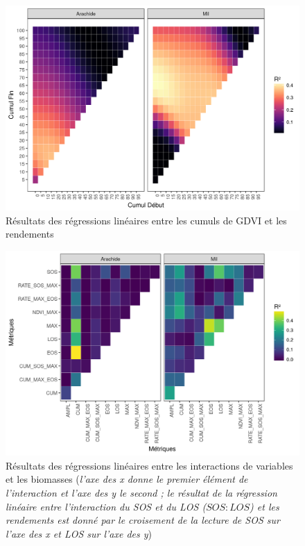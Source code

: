 \begin{figure}[htbp]
 \begin{center}
  \includegraphics[scale=0.7]{resultats_discussions/Cum_Rdt_GDVI.png} 
 \end{center}
 \caption[Régressions linéaires entre cumuls de GDVI et rendements]{Résultats des régressions linéaires entre les cumuls de GDVI et les rendements}
 \label{fig-cum-rdt-gdvi}
\end{figure}

\begin{figure}[htbp]
 \begin{center}
  \includegraphics[scale=0.7]{resultats_discussions/Inter_Rdt.png} 
 \end{center}
 \caption[Régressions linéaires entre interactions et rendements]{Résultats des régressions linéaires entre les interactions de variables et les biomasses (\emph{l’axe des x donne le premier élément de l’interaction et l’axe des y le second ; le résultat de la régression linéaire entre l’interaction du SOS et du LOS ($SOS : LOS$) et les rendements est donné par le croisement de la lecture de SOS sur l’axe des x et LOS sur l’axe des y})}
 \label{fig-inter-rdt}
\end{figure}

